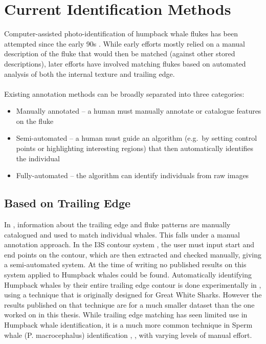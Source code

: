 
\section{Current Identification Methods}


Computer-assisted photo-identification of humpback whale flukes has been attempted since the early 90s \cite{mizroch1990computer}.
While early efforts mostly relied on a manual description of the fluke that would then be matched (against other stored descriptions), later efforts have involved matching flukes based on automated analysis of both the internal texture and trailing edge.
\\\\
Existing annotation methods can be broadly separated into three categories:

\begin{itemize}
	\item Manually annotated -- a human must manually annotate or catalogue features on the fluke
	\item Semi-automated -- a human must guide an algorithm (e.g.\ by setting control points or highlighting interesting regions) that then automatically identifies the individual
	\item Fully-automated -- the algorithm can identify individuals from raw images
\end{itemize}

\subsection{Based on Trailing Edge}

In \cite{mizroch1990computer}, information about the trailing edge and fluke patterns are manually catalogued and used to match individual whales. This falls under a manual annotation approach.
In the I3S contour system \cite{i3scontour}, the user must input start and end points on the contour, which are then extracted and checked manually, giving a semi-automated system. 
At the time of writing no published results on this system applied to Humpback whales could be found.
Automatically identifying Humpback whales by their entire trailing edge contour is done experimentally in \cite{hughes2015automated}, using a technique that is originally designed for Great White Sharks. 
However the results published on that technique are for a much smaller dataset than the one worked on in this thesis.
While trailing edge matching has seen limited use in Humpback whale identification, it is a much more common technique in Sperm whale (P. macrocephalus) identification \cite{huele2000finding}, \cite{beekmans2005comparison} \cite{whitehead1990computer}, with varying levels of manual effort.

